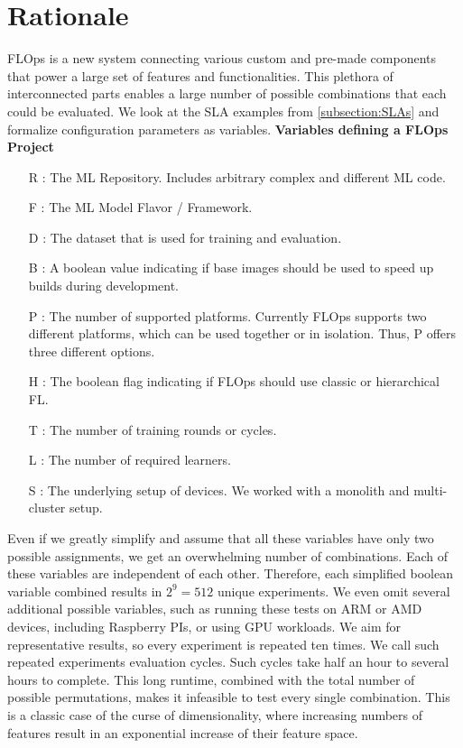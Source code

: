 
\section{Rationale}

FLOps is a new system connecting various custom and pre-made components that power a large set of features and functionalities.
This plethora of interconnected parts enables a large number of possible combinations that each could be evaluated.
We look at the SLA examples from \ref{subsection:SLAs} and formalize configuration parameters as variables.
\vspace{5mm}
\newline
\textbf{Variables defining a FLOps Project}
\begin{itemize}
    \item [R]:
        The ML Repository.
        Includes arbitrary complex and different ML code.
    \item [F]:
        The ML Model Flavor / Framework.
    \item [D]:
        The dataset that is used for training and evaluation.
    \item [B]:
        A boolean value indicating if base images should be used to speed up builds during development.
    \item [P]:
        The number of supported platforms.
        Currently FLOps supports two different platforms, which can be used together or in isolation.
        Thus, P offers three different options.
    \item [H]:
        The boolean flag indicating if FLOps should use classic or hierarchical FL.
    \item [T]:
        The number of training rounds or cycles.
    \item [L]:
        The number of required learners.
    \item [S]:
        The underlying setup of devices.
        We worked with a monolith and multi-cluster setup.
\end{itemize}

Even if we greatly simplify and assume that all these variables have only two possible assignments, we get an overwhelming number of combinations.
Each of these variables are independent of each other.
Therefore, each simplified boolean variable combined results in $ 2^9 = 512$ unique experiments.
We even omit several additional possible variables, such as running these tests on ARM or AMD devices, including Raspberry PIs, or using GPU workloads.
We aim for representative results, so every experiment is repeated ten times.
We call such repeated experiments evaluation cycles.
Such cycles take half an hour to several hours to complete.
This long runtime, combined with the total number of possible permutations, makes it infeasible to test every single combination.
This is a classic case of the curse of dimensionality, where increasing numbers of features result in an exponential increase of their feature space.

